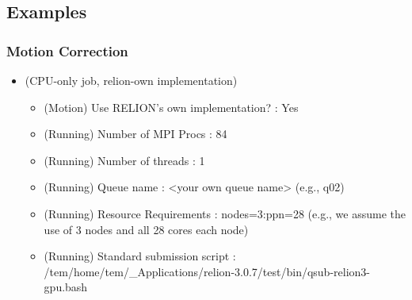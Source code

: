 \documentclass[letterpaper,10pt,english]{sphinxmanual}
\begin{document}
\subsection{Examples}
\label{\detokenize{relion:examples}}

\subsubsection{Motion Correction}
\label{\detokenize{relion:motion-correction}}\begin{itemize}
\item {} 
 (CPU-only job, relion-own implementation)
\begin{itemize}
\item {} 
(Motion) Use RELION’s own implementation? : Yes

\item {} 
(Running) Number of MPI Procs : 84

\item {} 
(Running) Number of threads : 1

\item {} 
(Running) Queue name : \textless{}your own queue name\textgreater{} (e.g., q02)

\item {} 
(Running) Resource Requirements : nodes=3:ppn=28  (e.g., we assume the use of 3 nodes and all 28 cores each node)

\item {} 
(Running) Standard submission script : /tem/home/tem/\_Applications/relion-3.0.7/test/bin/qsub-relion3-gpu.bash

\end{itemize}

\end{itemize}

\end{document}
